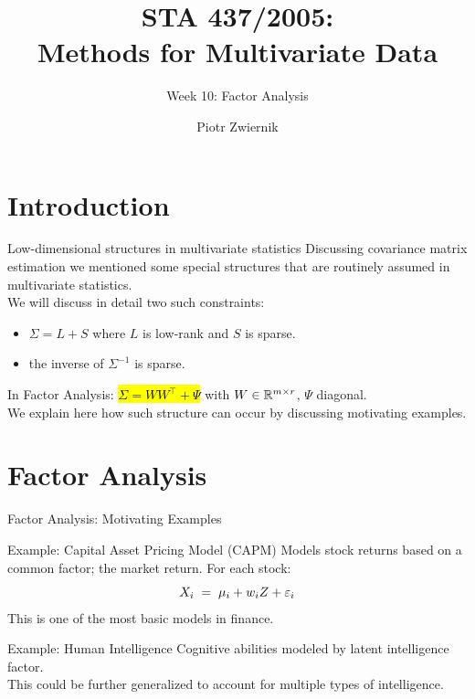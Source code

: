 \documentclass[11pt,handout,aspectratio=169]{beamer}
\title[STA437-Week1]{STA 437/2005: \\ Methods for Multivariate Data}
\subtitle[]{Week 10: Factor Analysis}
\author[Piotr Zwiernik]{Piotr Zwiernik}
\institute[UofT]{University of Toronto}
\date{}
\begin{document}
\maketitle
\section{Introduction}
\begin{frame}{Low-dimensional structures in multivariate statistics}
Discussing covariance matrix estimation we mentioned some special structures that are routinely assumed in multivariate statistics. \\[4mm]

We will discuss in detail two such constraints:
\begin{itemize}
	\item $\Sigma=L+S$ where $L$ is low-rank and $S$ is sparse. 
	\item the inverse of $\Sigma^{-1}$ is sparse.\\[4mm]
\end{itemize}

In Factor Analysis: \hl{$\Sigma=WW^\top +\Psi$} with $W\in \mathbb R^{m\times r}$, $\Psi$ diagonal.\\[4mm]

We explain here how such structure can occur by discussing motivating examples.

\end{frame}




\section{Factor Analysis }


\begin{frame}{Factor Analysis: Motivating Examples}
\begin{block}{Example: Capital Asset Pricing Model (CAPM)}
	Models stock returns based on a common factor; the \alert{market return}. For each stock:
	\[ X_i \;=\; \mu_i + w_i Z + \varepsilon_i \]
This is one of the most basic models in finance.
\end{block}
\begin{alertblock}{Example: Human Intelligence}
	Cognitive abilities modeled by latent \alert{intelligence factor}.\\[3mm]
	This could be further generalized to account for multiple types of intelligence.
\end{alertblock}
\end{frame}
\end{document}
